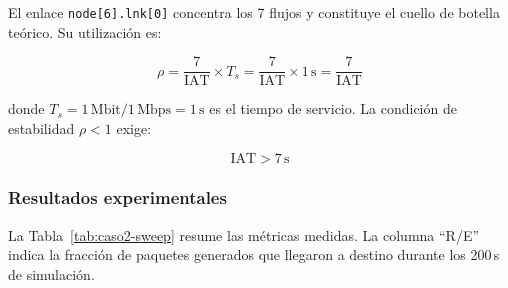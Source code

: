 \documentclass[10pt,letterpaper,twocolumn]{article}
\newcommand{\coltablesetup}{%
  \scriptsize
  \setlength{\tabcolsep}{3pt}%
  \renewcommand{\arraystretch}{1.08}%
}
\begin{document}
\begin{table}[!ht]
  \centering
  \caption{Flujos acumulados por enlace bajo routing baseline
           (dirección decreciente, destino \texttt{node[5]}).}
  \label{tab:flujos}
  \coltablesetup
\end{table}

El enlace \texttt{node[6].lnk[0]} concentra los 7 flujos y constituye el
cuello de botella teórico. Su utilización es:

\begin{equation}
  \rho = \frac{7}{\mathrm{IAT}} \times T_s
       = \frac{7}{\mathrm{IAT}} \times 1\,\mathrm{s}
       = \frac{7}{\mathrm{IAT}}
  \label{eq:rho}
\end{equation}

\noindent donde $T_s = 1\,\mathrm{Mbit}/1\,\mathrm{Mbps} = 1\,\mathrm{s}$
es el tiempo de servicio. La condición de estabilidad $\rho < 1$ exige:

\begin{equation}
  \mathrm{IAT} > 7\,\mathrm{s}
  \label{eq:umbral}
\end{equation}

\subsubsection*{Resultados experimentales}

La Tabla~\ref{tab:caso2-sweep} resume las métricas medidas. La columna
``R/E'' indica la fracción de paquetes generados que llegaron a destino
durante los 200\,s de simulación.
\end{document}
